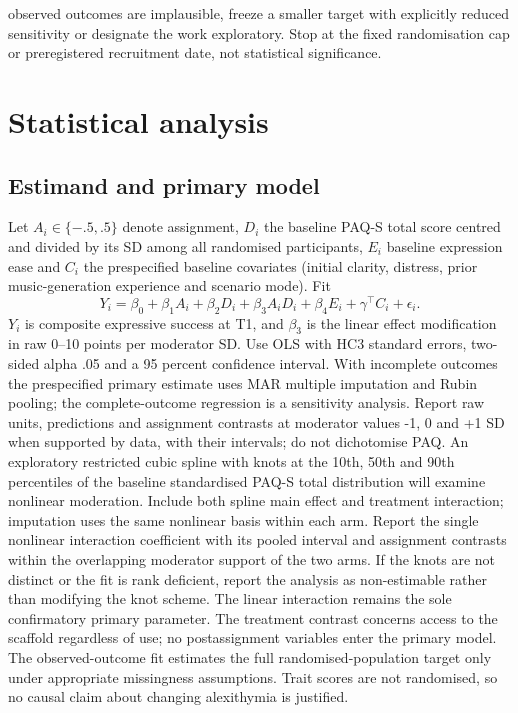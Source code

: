 \documentclass[11pt,a4paper]{article}
\begin{document}
observed outcomes are implausible, freeze a smaller target with explicitly reduced sensitivity or designate the work exploratory. Stop at the fixed randomisation cap or preregistered recruitment date, not statistical significance.

\section{Statistical analysis}
\subsection{Estimand and primary model}
Let \(A_i\in\{-.5,.5\}\) denote assignment, \(D_i\) the baseline PAQ-S total score centred and divided by its SD among all randomised participants, \(E_i\) baseline expression ease and \(C_i\) the prespecified baseline covariates (initial clarity, distress, prior music-generation experience and scenario mode). Fit
\[
Y_i=\beta_0+\beta_1 A_i+\beta_2 D_i+
\beta_3 A_iD_i+\beta_4 E_i+\gamma^\top C_i+\epsilon_i.
\]
\(Y_i\) is composite expressive success at T1, and \(\beta_3\) is the linear effect modification in raw 0--10 points per moderator SD. Use OLS with HC3 standard errors, two-sided alpha .05 and a 95 percent confidence interval. With incomplete outcomes the prespecified primary estimate uses MAR multiple imputation and Rubin pooling; the complete-outcome regression is a sensitivity analysis. Report raw units, predictions and assignment contrasts at moderator values -1, 0 and +1 SD when supported by data, with their intervals; do not dichotomise PAQ. An exploratory restricted cubic spline with knots at the 10th, 50th and 90th percentiles of the baseline standardised PAQ-S total distribution will examine nonlinear moderation. Include both spline main effect and treatment interaction; imputation uses the same nonlinear basis within each arm. Report the single nonlinear interaction coefficient with its pooled interval and assignment contrasts within the overlapping moderator support of the two arms. If the knots are not distinct or the fit is rank deficient, report the analysis as non-estimable rather than modifying the knot scheme. The linear interaction remains the sole confirmatory primary parameter. The treatment contrast concerns access to the scaffold regardless of use; no postassignment variables enter the primary model. The observed-outcome fit estimates the full randomised-population target only under appropriate missingness assumptions. Trait scores are not randomised, so no causal claim about changing alexithymia is justified.
\end{document}
